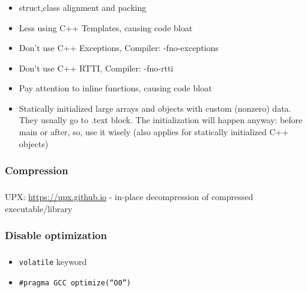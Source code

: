 \documentclass{beamer}
\begin{document}
\begin{frame}
\frametitle{\subsubsecname}
\begin{itemize}
    \item struct,class alignment and packing
    \item Less using C++ Templates, causing code bloat
    \item Don’t use C++ Exceptions, Compiler: -fno-exceptions
    \item Don’t use C++ RTTI, Compiler: -fno-rtti
    \item Pay attention to inline functions, causing code bloat
    \item Statically initialized large arrays and objects with custom (nonzero) data. They usually go to .text block. The initialization will happen anyway: before main or after, so, use it wisely (also applies for statically initialized C++ objects)
\end{itemize}
\end{frame}

\subsubsection{Compression}
\begin{frame}
\frametitle{\subsubsecname}
UPX: \url{https://upx.github.io} - in-place decompression of compressed executable/library
\end{frame}

\subsubsection{Disable optimization}
\begin{frame}
\frametitle{\subsubsecname}
\begin{itemize}
	\item \texttt{volatile} keyword
	\item \texttt{\#pragma GCC optimize(``O0'')}
\end{itemize}
\end{frame}
\end{document}
